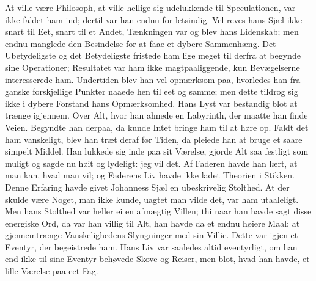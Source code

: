 \documentclass[12pt,a4paper]{article}
\begin{document}
At ville være Philosoph, at ville hellige sig udelukkende til Speculationen, var ikke faldet ham ind; dertil var han endnu for letsindig. Vel reves hans Sjæl ikke snart til Eet, snart til et Andet, Tænkningen var og blev hans Lidenskab; men endnu manglede den Besindelse for at faae et dybere Sammenhæng. Det Ubetydeligste og det Betydeligste fristede ham lige meget til derfra at begynde sine Operationer; Resultatet var ham ikke magtpaaliggende, kun Bevægelserne interesserede ham. Undertiden blev han vel opmærksom paa, hvorledes han fra ganske forskjellige Punkter naaede hen til eet og samme; men dette tildrog sig ikke i dybere Forstand hans Opmærksomhed. Hans Lyst var bestandig blot at trænge igjennem. Over Alt, hvor han ahnede en Labyrinth, der maatte han finde Veien. Begyndte han derpaa, da kunde Intet bringe ham til at høre op. Faldt det ham vanskeligt, blev han træt deraf før Tiden, da pleiede han at bruge et saare simpelt Middel. Han lukkede sig inde paa sit Værelse, gjorde Alt saa festligt som muligt og sagde nu høit og lydeligt: jeg vil det. Af Faderen havde han lært, at man kan, hvad man vil; og Faderens Liv havde ikke ladet Theorien i Stikken. Denne Erfaring havde givet Johanness Sjæl en ubeskrivelig Stolthed. At der skulde være Noget, man ikke kunde, uagtet man vilde det, var ham utaaleligt. Men hans Stolthed var heller ei en afmægtig Villen; thi naar han havde sagt disse energiske Ord, da var han villig til Alt, han havde da et endnu høiere Maal: at gjennemtrænge Vanskelighedens Slyngninger med sin Villie. Dette var igjen et Eventyr, der begeistrede ham. Hans Liv var saaledes altid eventyrligt, om han end ikke til sine Eventyr behøvede Skove og Reiser, men blot, hvad han havde, et lille Værelse paa eet Fag.
\end{document}
